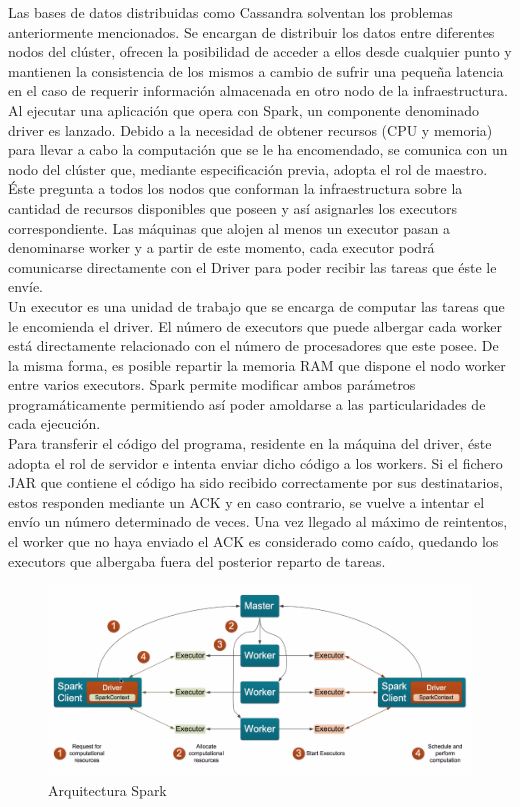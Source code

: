 Las bases de datos distribuidas como Cassandra solventan los problemas anteriormente mencionados. Se encargan de distribuir los datos entre diferentes nodos del clúster, ofrecen la posibilidad de acceder a ellos desde cualquier punto y mantienen la consistencia de los mismos a cambio de sufrir una pequeña latencia en el caso de requerir información almacenada en otro nodo de la infraestructura.\\ 

Al ejecutar una aplicación que opera con Spark, un componente denominado driver es lanzado. Debido a la necesidad de obtener recursos (CPU y memoria) para llevar a cabo la computación que se le ha encomendado, se comunica con un nodo del clúster que, mediante especificación previa, adopta el rol de maestro. Éste pregunta a todos los nodos que conforman la infraestructura sobre la cantidad de recursos disponibles que poseen y así asignarles los executors correspondiente. Las máquinas que alojen al menos un executor pasan a denominarse worker y a partir de este momento, cada executor podrá comunicarse directamente con el Driver para poder recibir las tareas que éste le envíe.\\

Un executor es una unidad de trabajo que se encarga de computar las tareas que le encomienda el driver. El número de executors que puede albergar cada worker está directamente relacionado con el número de procesadores que este posee. De la misma forma, es posible repartir la memoria RAM que dispone el nodo worker entre varios executors. Spark permite modificar ambos parámetros programáticamente permitiendo así poder amoldarse a las particularidades de cada ejecución.\\

Para transferir el código del programa, residente en la máquina del driver, éste adopta  el rol de servidor e intenta enviar dicho código a los workers. Si el fichero JAR que contiene el código ha sido recibido correctamente por sus destinatarios, estos responden mediante un ACK y en caso contrario, se vuelve a intentar el envío un número determinado de veces. Una vez llegado al máximo de reintentos, el worker que no haya enviado el ACK es considerado como caído, quedando los executors que albergaba fuera del posterior reparto de tareas.\\

\begin{figure}[h]
	\centering
	\includegraphics[width=1\textwidth]{Ilustraciones/spark_architecture.png}
	\caption{Arquitectura Spark}
	\label{fig:spark_architecture}
\end{figure}

